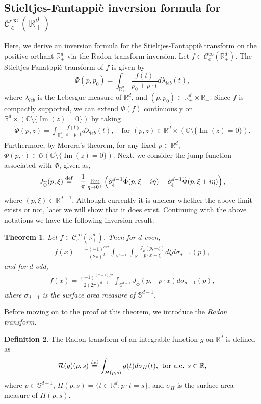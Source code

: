 \documentclass[11pt,reqno]{amsart}
\theoremstyle{plain}
\newtheorem{theorem}{Theorem}[section]
\theoremstyle{definition}
\newtheorem{definition}[theorem]{Definition}
\numberwithin{equation}{section}
\newcommand{\R}{\mathbb{R}}
\newcommand{\C}{\mathbb{C}}
\newcommand{\ltt}{\left(}
\newcommand{\rtt}{\right)}
\newcommand{\beas}{\begin{eqnarray*}}
\newcommand{\eeas}{\end{eqnarray*}}
\newcommand{\bea} {\begin{eqnarray}}
\newcommand{\eea} {\end{eqnarray}}
\newcommand{\bydef}{\stackrel{\rm def}{=}}
\begin{document}
	
	\subsection{Stieltjes-Fantappi\`e inversion formula for $\mathcal{C}^\infty_c(\R^d_+)$ }
    Here, we derive an inversion formula for the Stieltjes-Fantappi{\`e} transform on the positive orthant $\R^d_+$ via the Radon transform inversion. Let $f\in \mathcal{C}^\infty_c(\R^d_+)$. The Stieltjes-Fanatppi{\`e} transform of $f$ is given by
	\[
	\Phi(p,p_0)=\int_{\R^d_+}\frac{f(t)}{p_0+p\cdot t} d\lambda_{leb}(t),
	\]
	where $\lambda_{leb}$ is the Lebesgue measure of $\R^d$, and $(p,p_0)\in \R^d_+\times \R_+.$
	Since $f$ is compactly supported, we can extend $\Phi(f)$ continuously on $\R^d\times(\C\setminus\{\operatorname{Im}(z)=0\})$ by taking
	\bea\label{eq:extn fan}
	\widetilde{\Phi}(p,z)=\int_{\R^d_+}\frac{f(t)}{z+p\cdot t} d\lambda_{leb}(t),\quad \text{for } (p,z)\in \R^d\times(\C\setminus\{\operatorname{Im}(z)=0\}).
	\eea
	Furthermore, by Morera's theorem, for any fixed $p\in\R^d$, $\widetilde{\Phi}(p,\cdot)\in\mathcal{O}(\C\setminus\{\operatorname{Im}(z)=0\}).$ 
	Next, we consider the jump function associated with $\widetilde{\Phi}$, given as,
	\bea\label{eq:jump fns}
	J_{\widetilde{\Phi}}(p, \xi)& \bydef &\frac{1}{\pi}\lim\limits_{\eta\rightarrow 0^+}\ltt{{\partial^{d-1}_{\xi}\widetilde{\Phi}}(p,\xi-i\eta)-{\partial^{d-1}_\xi\widetilde{\Phi}}(p,\xi+i\eta)}\rtt,
	\eea
	where $(p,\xi)\in \R^{d+1}$. Although currently it is unclear whether the above limit exists or not, later we will show that it does exist. Continuing with the above notations we have the following inversion result.
	\begin{theorem}\label{th:inversion fan}
		Let $f\in \mathcal C^\infty_c(\R^d_+)$. Then for $d$ even, 
		\bea\label{eq:inversion even}
		f(x)= \frac{-(-1)^{d/2}}{(2\pi)^d} {\int_{\mathbb S^{d-1}}{\int_\R}}\frac{ J_{\widetilde{\Phi}}(p,-\xi)}{p\cdot x-\xi} d\xi d\sigma_{d-1}(p),
		\eea
		and for $d$ odd,
		\bea\label{eq:inversion odd}
		f(x)=\frac{(-1)^{(d-1)/2}}{2(2\pi)^{d-1}} {\int_{\mathbb S^{d-1}}}  J_{\widetilde{\Phi}}(p,-p\cdot x) d\sigma_{d-1}(p),
		\eea
		where $\sigma_{d-1}$ is the surface area measure of $\mathbb S^{d-1}$.
	\end{theorem}
	Before moving on to the proof of this theorem, we introduce the {\em Radon transform}. 
    \begin{definition}\label{Def:Radon}
        The Radon transform of 
	an integrable function $g$ on $\R^d$ is defined as
	\beas
	\mathcal R(g)(p,s) \bydef \int_{H(p,s)} g(t) d\sigma_H(t),\, \text{ for a.e. } s\in\R,
	\eeas
	where $p\in \mathbb S^{d-1}$, $H(p,s)=\{t\in\R^d: p\cdot t=s\}$, and $\sigma_H$ is the surface area measure of $H(p,s)$.
    \end{definition}
    
\end{document}

